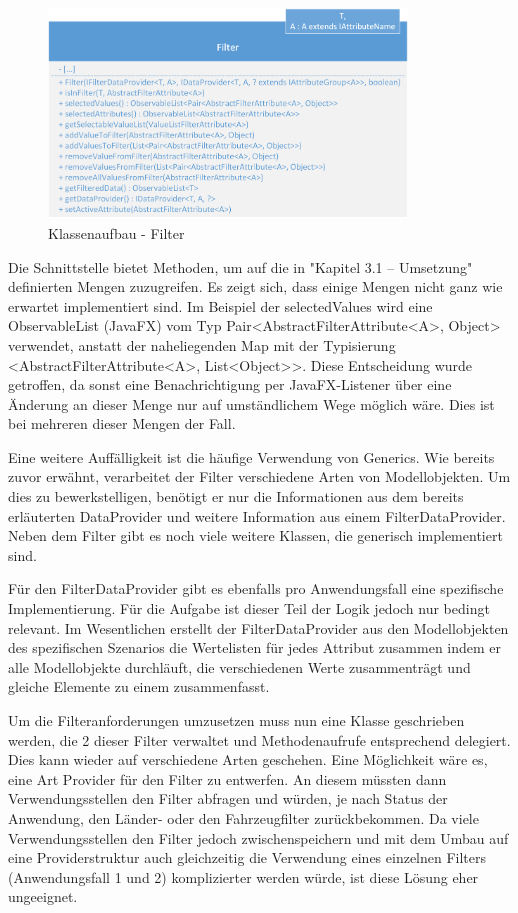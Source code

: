 \begin{figure}[H]
 \centering
 \includegraphics[width=0.85\textwidth]{grafiken/Class_Filter.png}
 \caption{Klassenaufbau - Filter}
 \label{fig:multiFilter1}
\end{figure}

Die Schnittstelle bietet Methoden, um auf die in "Kapitel 3.1 – Umsetzung" definierten Mengen zuzugreifen. Es zeigt sich, dass einige Mengen  nicht ganz wie erwartet implementiert sind. Im Beispiel der selectedValues wird eine ObservableList (JavaFX) vom Typ Pair<AbstractFilterAttribute<A>, Object> verwendet, anstatt der naheliegenden Map mit der Typisierung <AbstractFilterAttribute<A>, List<Object>>. Diese Entscheidung wurde getroffen, da sonst eine Benachrichtigung per JavaFX-Listener über eine Änderung an dieser Menge nur auf umständlichem Wege möglich wäre. Dies ist bei mehreren dieser Mengen der Fall.

Eine weitere Auffälligkeit ist die häufige Verwendung von Generics. Wie bereits zuvor erwähnt, verarbeitet der Filter verschiedene Arten von Modellobjekten. Um dies zu bewerkstelligen, benötigt er nur die Informationen aus dem bereits erläuterten DataProvider und weitere Information aus einem FilterDataProvider. Neben dem Filter gibt es noch viele weitere Klassen, die generisch implementiert sind.

Für den FilterDataProvider gibt es ebenfalls pro Anwendungsfall eine spezifische Implementierung. Für die Aufgabe ist dieser Teil der Logik jedoch nur bedingt relevant. Im Wesentlichen erstellt der FilterDataProvider aus den Modellobjekten des spezifischen Szenarios die Wertelisten für jedes Attribut zusammen indem er alle Modellobjekte durchläuft, die verschiedenen Werte zusammenträgt und gleiche Elemente zu einem zusammenfasst.

Um die Filteranforderungen umzusetzen muss nun eine Klasse geschrieben werden, die 2 dieser Filter verwaltet und Methodenaufrufe entsprechend delegiert. Dies kann wieder auf verschiedene Arten geschehen. Eine Möglichkeit wäre es, eine Art Provider für den Filter zu entwerfen. An diesem müssten dann Verwendungsstellen den Filter abfragen und würden, je nach Status der Anwendung, den Länder- oder den Fahrzeugfilter zurückbekommen. Da viele Verwendungsstellen den Filter jedoch zwischenspeichern und mit dem Umbau auf eine Providerstruktur auch gleichzeitig die Verwendung eines einzelnen Filters (Anwendungsfall 1 und 2) komplizierter werden würde, ist diese Lösung eher ungeeignet.

